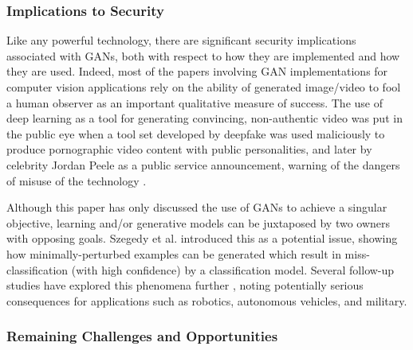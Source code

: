 \documentclass[11pt]{article}
\begin{document}

\subsubsection{Implications to Security}

Like any powerful technology, there are significant security implications associated with GANs, both with respect to how they are implemented and how they are used.  Indeed, most of the papers involving GAN implementations for computer vision applications rely on the ability of generated image/video to fool a human observer as an important qualitative measure of success.  The use of deep learning as a tool for generating convincing, non-authentic video was put in the public eye when a tool set developed by deepfake \cite{deepfakes-faceswap} was used maliciously to produce pornographic video content with public personalities, and later by celebrity Jordan Peele as a public service announcement, warning of the dangers of misuse of the technology \cite{peeleDeepFakes}.  

Although this paper has only discussed the use of GANs to achieve a singular objective, learning and/or generative models can be juxtaposed by two owners with opposing goals.  Szegedy et al. introduced this as a potential issue, showing how minimally-perturbed examples can be generated which result in miss-classification (with high confidence) by a classification model.  Several follow-up studies have explored this phenomena further \cite{carlini2016towards, kos2017adversarial, moosavi2017universal, athalye2017synthesizing}, noting potentially serious consequences for applications such as robotics, autonomous vehicles, and military.


\subsubsection{Remaining Challenges and Opportunities}
\end{document}
